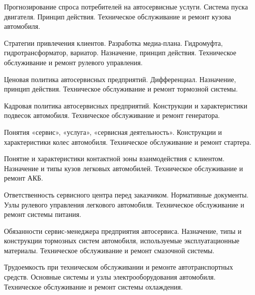 \documentclass[
	11pt,
	a4paper,
	]
	{article}
\begin{document}
\bigskip

\noindent{} 
	{
		Прогнозирование спроса потребителей на автосервисные услуги.
	}{
		Система пуска двигателя. Принцип действия.
	}{
		Техническое обслуживание и ремонт кузова автомобиля.
	}

\bigskip

\noindent{} 
	{
		Стратегии привлечения клиентов. Разработка медиа-плана.
	}{
		Гидромуфта, гидротрансформатор, вариатор. Назначение, принцип действия.
	}{
		Техническое обслуживание и ремонт рулевого управления.
	}

\bigskip

\noindent{} 
	{
		Ценовая политика автосервисных предприятий.
	}{
		Дифференциал. Назначение, принцип действия.
	}{
		Техническое обслуживание и ремонт тормозной системы.
	}

\bigskip

\noindent{} 
	{
		Кадровая политика автосервисных предприятий.
	}{
		Конструкции и характеристики подвесок автомобиля.
	}{
		Техническое обслуживание и ремонт генератора.
	}

\bigskip

\noindent{} 
	{
		Понятия «сервис», «услуга», «сервисная деятельность».
	}{
		Конструкции и характеристики колес автомобиля.
	}{
		Техническое обслуживание и ремонт стартера.
	}

\bigskip

\noindent{} 
	{
		Понятие и характеристики контактной зоны взаимодействия с клиентом.
	}{
		Назначение и типы кузов легковых автомобилей.
	}{
		Техническое обслуживание и ремонт АКБ.
	}

\bigskip

\noindent{} 
	{
		Ответственность сервисного центра перед заказчиком. Нормативные документы.
	}{
		Узлы рулевого управления легкового автомобиля.
	}{
		Техническое обслуживание и ремонт системы питания.
	}

\bigskip

\noindent{} 
	{
		Обязанности сервис-менеджера предприятия автосервиса.
	}{
		Назначение, типы и конструкции тормозных систем автомобиля, используемые эксплуатационные материалы.
	}{
		Техническое обслуживание и ремонт смазочной системы.
	}

\bigskip

\noindent{} 
	{
		Трудоемкость при техническом обслуживании и ремонте автотранспортных средств.
	}{
		Основные системы и узлы электрооборудования автомобиля.
	}{
		Техническое обслуживание и ремонт системы охлаждения.
	}
\end{document}
